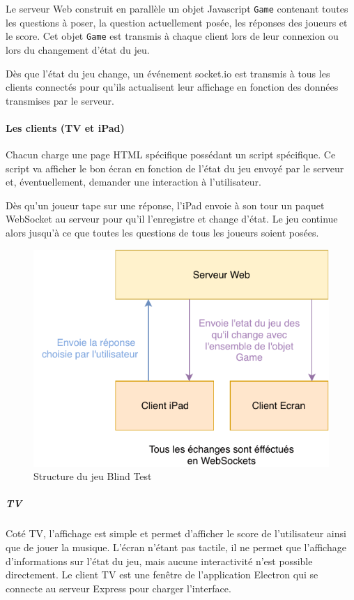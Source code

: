 Le serveur Web construit en parallèle un objet Javascript \texttt{Game} contenant toutes les questions à poser, la question actuellement posée, les réponses des joueurs et le score.
Cet objet \texttt{Game} est transmis à chaque client lors de leur connexion ou lors du changement d'état du jeu.

Dès que l'état du jeu change, un événement socket.io est transmis à tous les clients connectés pour qu'ils actualisent leur affichage en fonction des données transmises par le serveur.

\paragraph{Les clients (TV et iPad)} Chacun charge une page HTML spécifique possédant un script spécifique.
Ce script va afficher le bon écran en fonction de l'état du jeu envoyé par le serveur et, éventuellement, demander une interaction à l'utilisateur.

Dès qu'un joueur tape sur une réponse, l'iPad envoie à son tour un paquet WebSocket au serveur pour qu'il l'enregistre et change d'état.
Le jeu continue alors jusqu'à ce que toutes les questions de tous les joueurs soient posées.

\begin{figure}[h]
    \centering
    \includegraphics{img/ah-blindtest.pdf}
    \caption{Structure du jeu Blind Test}
\end{figure}

\subparagraph{TV} Coté TV, l'affichage est simple et permet d'afficher le score de l'utilisateur ainsi que de jouer la musique.
L'écran n'étant pas tactile, il ne permet que l'affichage d'informations sur l'état du jeu, mais aucune interactivité n'est possible directement.
Le client TV est une fenêtre de l'application Electron qui se connecte au serveur Express pour charger l'interface.

